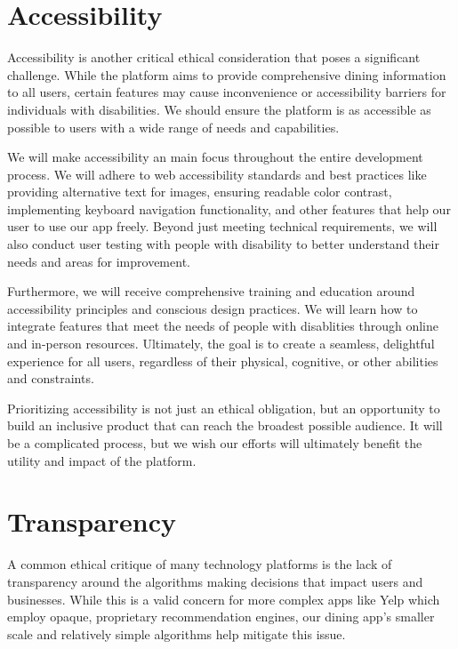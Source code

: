 \documentclass[10pt,twocolumn]{article}
\begin{document}
\section{Accessibility}
Accessibility is another critical ethical consideration that poses a significant challenge. While the platform aims to provide comprehensive dining information to all users, certain features may cause inconvenience or accessibility barriers for individuals with disabilities. We should ensure the platform is as accessible as possible to users with a wide range of needs and capabilities.

We will make accessibility an main focus throughout the entire development process. We will adhere to web accessibility standards and best practices like providing alternative text for images, ensuring readable color contrast, implementing keyboard navigation functionality, and other features that help our user to use our app freely. Beyond just meeting technical requirements, we will also conduct user testing with people with disability to better understand their needs and areas for improvement.

Furthermore, we will receive comprehensive training and education around accessibility principles and conscious design practices. We will learn how to integrate features that meet the needs of people with disablities through online and in-person resources. Ultimately, the goal is to create a seamless, delightful experience for all users, regardless of their physical, cognitive, or other abilities and constraints.

Prioritizing accessibility is not just an ethical obligation, but an opportunity to build an inclusive product that can reach the broadest possible audience. It will be a complicated process, but we wish our efforts will ultimately benefit the utility and impact of the platform.



\section{Transparency}

A common ethical critique of many technology platforms is the lack of transparency around the algorithms making decisions that impact users and businesses. While this is a valid concern for more complex apps like Yelp which employ opaque, proprietary recommendation engines, our dining app's smaller scale and relatively simple algorithms help mitigate this issue.
\end{document}
